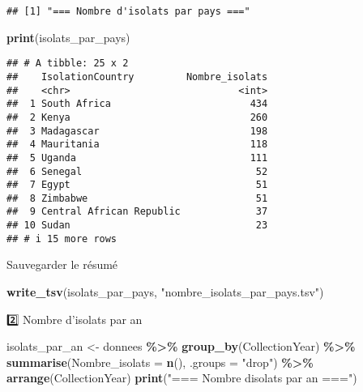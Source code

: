 \documentclass[
]{article}
\newenvironment{Shaded}{\begin{snugshade}}{\end{snugshade}}
\newcommand{\AttributeTok}[1]{\textcolor[rgb]{0.13,0.29,0.53}{#1}}
\newcommand{\FunctionTok}[1]{\textcolor[rgb]{0.13,0.29,0.53}{\textbf{#1}}}
\newcommand{\NormalTok}[1]{#1}
\newcommand{\OtherTok}[1]{\textcolor[rgb]{0.56,0.35,0.01}{#1}}
\newcommand{\SpecialCharTok}[1]{\textcolor[rgb]{0.81,0.36,0.00}{\textbf{#1}}}
\newcommand{\StringTok}[1]{\textcolor[rgb]{0.31,0.60,0.02}{#1}}
\begin{document}
\begin{verbatim}
## [1] "=== Nombre d'isolats par pays ==="
\end{verbatim}

\begin{Shaded}
\begin{Highlighting}[]
\FunctionTok{print}\NormalTok{(isolats\_par\_pays)}
\end{Highlighting}
\end{Shaded}

\begin{verbatim}
## # A tibble: 25 x 2
##    IsolationCountry         Nombre_isolats
##    <chr>                             <int>
##  1 South Africa                        434
##  2 Kenya                               260
##  3 Madagascar                          198
##  4 Mauritania                          118
##  5 Uganda                              111
##  6 Senegal                              52
##  7 Egypt                                51
##  8 Zimbabwe                             51
##  9 Central African Republic             37
## 10 Sudan                                23
## # i 15 more rows
\end{verbatim}

Sauvegarder le résumé

\begin{Shaded}
\begin{Highlighting}[]
\FunctionTok{write\_tsv}\NormalTok{(isolats\_par\_pays, }\StringTok{"nombre\_isolats\_par\_pays.tsv"}\NormalTok{)}
\end{Highlighting}
\end{Shaded}

2️⃣ Nombre d'isolats par an

\begin{Shaded}
\begin{Highlighting}[]
\NormalTok{isolats\_par\_an }\OtherTok{\textless{}{-}}\NormalTok{ donnees }\SpecialCharTok{\%\textgreater{}\%}
  \FunctionTok{group\_by}\NormalTok{(CollectionYear) }\SpecialCharTok{\%\textgreater{}\%}
  \FunctionTok{summarise}\NormalTok{(}\AttributeTok{Nombre\_isolats =} \FunctionTok{n}\NormalTok{(), }\AttributeTok{.groups =} \StringTok{"drop"}\NormalTok{) }\SpecialCharTok{\%\textgreater{}\%}
  \FunctionTok{arrange}\NormalTok{(CollectionYear)}
\FunctionTok{print}\NormalTok{(}\StringTok{"=== Nombre d\textquotesingle{}isolats par an ==="}\NormalTok{)}
\end{Highlighting}
\end{Shaded}
\end{document}
